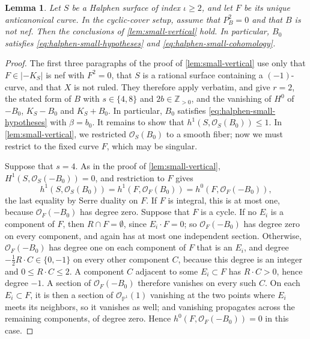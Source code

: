 \documentclass[11pt,reqno]{amsart}
\numberwithin{equation}{section}
\newtheorem{lemma}[lemma]{Lemma}
\theoremstyle{remark}
\newcommand{\sshf}[1]{\mathcal{O}_{#1}}
\newcommand{\prj}[1]{\mathbb{P}^{#1}}
\begin{document}
\begin{lemma}\label{lem:halphen-small-data}
Let \(S\) be a Halphen surface of index \(\iota\geq2\), and let \(F\) be its unique anticanonical curve. In the cyclic-cover setup, assume that \(P_B^2=0\) and that \(B\) is not nef. Then the conclusions of \cref{lem:small-vertical} hold. In particular, \(B_0\) satisfies \eqref{eq:halphen-small-hypotheses} and \eqref{eq:halphen-small-cohomology}.
\end{lemma}

\begin{proof}
The first three paragraphs of the proof of \cref{lem:small-vertical} use only that \(F\in|-K_S|\) is nef with \(F^2=0\), that \(S\) is a rational surface containing a \((-1)\)-curve, and that \(X\) is not ruled. They therefore apply verbatim, and give \(r=2\), the stated form of \(B\) with \(s\in\{4,8\}\) and \(2b\in\mathbb Z_{>0}\), and the vanishing of \(H^0\) of \(-B_0\), \(K_S-B_0\) and \(K_S+B_0\). In particular, \(B_0\) satisfies \eqref{eq:halphen-small-hypotheses} with \(\beta=b_0\). It remains to show that \(h^1(S,\sshf{S}(B_0))\leq1\). In \cref{lem:small-vertical}, we restricted \(\sshf{S}(B_0)\) to a smooth fiber; now we must restrict to the fixed curve \(F\), which may be singular.

Suppose that \(s=4\). As in the proof of \cref{lem:small-vertical}, \(H^1(S,\sshf{S}(-B_0))=0\), and restriction to \(F\) gives
\[
 h^1(S,\sshf{S}(B_0))=h^1(F,\sshf{F}(B_0))=h^0(F,\sshf{F}(-B_0)),
\]
the last equality by Serre duality on \(F\). If \(F\) is integral, this is at most one, because \(\sshf{F}(-B_0)\) has degree zero. Suppose that \(F\) is a cycle. If no \(E_i\) is a component of \(F\), then \(R\cap F=\emptyset\), since \(E_i\cdot F=0\); so \(\sshf{F}(-B_0)\) has degree zero on every component, and again has at most one independent section. Otherwise, \(\sshf{F}(-B_0)\) has degree one on each component of \(F\) that is an \(E_i\), and degree \(-\tfrac12R\cdot C\in\{0,-1\}\) on every other component \(C\), because this degree is an integer and \(0\leq R\cdot C\leq2\). A component \(C\) adjacent to some \(E_i\subset F\) has \(R\cdot C>0\), hence degree \(-1\). A section of \(\sshf{F}(-B_0)\) therefore vanishes on every such \(C\). On each \(E_i\subset F\), it is then a section of \(\sshf{\prj{1}}(1)\) vanishing at the two points where \(E_i\) meets its neighbors, so it vanishes as well; and vanishing propagates across the remaining components, of degree zero. Hence \(h^0(F,\sshf{F}(-B_0))=0\) in this case.


\end{proof}
\end{document}
